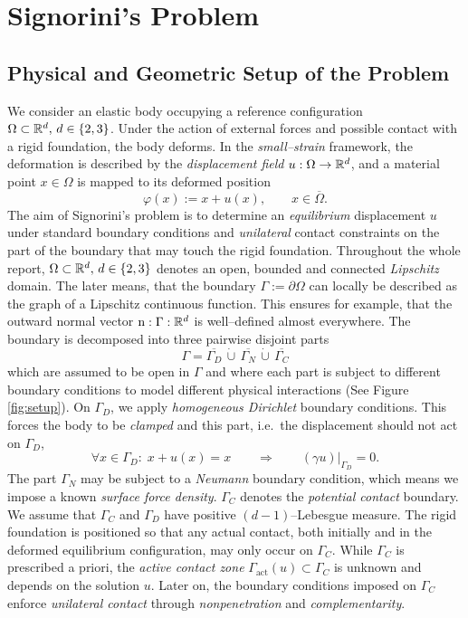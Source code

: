 \section{Signorini's Problem}


\subsection{Physical and Geometric Setup of the Problem}

We consider an elastic body occupying a reference configuration $\Omega\subset{\mathbb R}^d,\,d\in\{2,3\}$.
Under the action of external forces and possible contact with a rigid foundation, the body deforms.
In the {\em small--strain} framework, the deformation is described by the {\em displacement field}
$u:\Omega\to{\mathbb R}^d$, and a material point $x\in\Omega$ is mapped to its deformed position
\begin{equation*}
	\varphi(x) := x + u(x),\qquad x\in\overline{\Omega}.
\end{equation*}
The aim of Signorini's problem is to determine an {\em equilibrium} displacement $u$ under
standard boundary conditions and {\em unilateral} contact constraints on the part of the boundary
that may touch the rigid foundation. Throughout the whole report, $\Omega\subset {\mathbb R}^d,\, d\in\{2,3\}$ denotes an open, bounded and connected {\em Lipschitz} domain. The later means, that the boundary $\Gamma:=\partial\Omega$ can locally be described as the graph of a Lipschitz continuous function. This ensures for example, that the outward normal vector $\mathrm{n}:\Gamma:{\mathbb R}^d$ is well--defined almost everywhere. The boundary is decomposed into three pairwise disjoint parts
\begin{equation*}
	\Gamma = \overline{\Gamma_D}\,\mathbin{\dot\cup}\,\overline{\Gamma_N}\,\mathbin{\dot\cup}\,\overline{\Gamma_C}
\end{equation*}
which are assumed to be open in $\Gamma$ and where each part is subject to different boundary conditions to model different physical interactions (See Figure \ref{fig:setup}). On $\Gamma_D$, we apply {\em homogeneous Dirichlet} boundary conditions. This forces the body to be {\em clamped} and this part, i.e.\ the displacement should not act on $\Gamma_D$,
\begin{equation*}
	\forall x\in\Gamma_D:\;x + u(x) = x \qquad\Longrightarrow \qquad(\gamma u)|_{\Gamma_D} = 0.
\end{equation*}
The part $\Gamma_N$ may be subject to a {\em Neumann} boundary condition, which means we impose a known {\em surface force density}. $\Gamma_C$ denotes the {\em potential contact} boundary. We assume that $\Gamma_C$ and $\Gamma_D$ have positive $(d-1)$--Lebesgue measure. The rigid foundation is  positioned so that any actual contact, both initially and in the deformed equilibrium configuration, may only occur on $\Gamma_C$. While $\Gamma_C$ is prescribed a priori, the {\em active contact zone} $\Gamma_{\mathrm{act}}(u)\subset\Gamma_C$ is unknown and depends on the solution $u$. Later on, the boundary conditions imposed on $\Gamma_C$ enforce {\em unilateral contact} through {\em nonpenetration} and {\em complementarity}.
